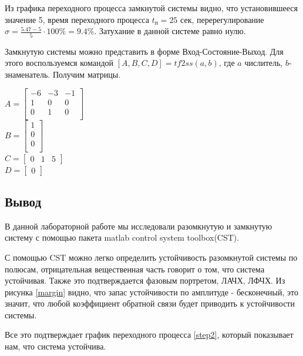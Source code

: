 \documentclass[a4paper, 12pt]{article}
\begin{document}
\newpage

Из графика переходного процесса замкнутой системы  видно, что установившееся значение 5, время переходного процесса $t_\text{п}=25$ сек, перерегулирование $\sigma=\frac{5.47-5}{5}\cdot100\%=9.4\%$. Затухание в данной системе равно нулю.\par

Замкнутую системы можно представить в форме Вход-Состояние-Выход. Для этого воспользуемся командой $[A,B,C,D]=tf2ss(a,b)$, где $a$ числитель, $b$- знаменатель. Получим матрицы.

$A=
\begin{bmatrix}
	-6	&	-3	&	-1\\
	1	&	0	&	0\\
	0	&	1	&	0\\
 \end{bmatrix}$\\
 
$B=
\begin{bmatrix}
	1\\
	0\\
	0\\
\end{bmatrix}$\\

$C=
\begin{bmatrix}
	0	&	1	&	5
\end{bmatrix}$\\

$D=
\begin{bmatrix}
	0
\end{bmatrix}$\\

\newpage

\begin{center}
	\section*{Вывод}
\end{center}\par
В данной лабораторной работе мы исследовали разомкнутую и замкнутую систему с помощью пакета matlab control system toolbox(CST).\par
С помощью CST можно легко определить устойчивость разомкнутой системы по полюсам, отрицательная вещественная часть говорит о том, что система устойчивая. Также это подтверждается фазовым портретом, ЛАЧХ, ЛФЧХ. Из рисунка \ref{margin} видно, что запас устойчивости по амплитуде - бесконечный, это значит, что любой коэффициент обратной связи будет приводить к устойчивости системы.\par
Все это подтверждает график переходного процесса \ref{step2}, который показывает нам, что система устойчива.
\end{document}

